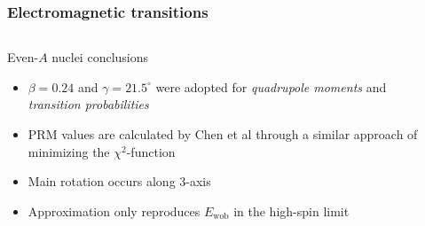 \documentclass{beamer}
\begin{document}
\begin{frame}
  \frametitle{Electromagnetic transitions}
  \begin{columns}
    \begin{column}{0.72\textwidth}
      \begin{block}{Even-$A$ nuclei conclusions}
        \begin{itemize}
          \item $\beta=0.24$ and $\gamma=21.5^\circ$ were adopted for \emph{quadrupole moments} and \emph{transition probabilities}
          \item \par PRM values are calculated by Chen et al through a similar approach of minimizing the $\chi^2$-function
          \item Main rotation occurs along $3$-axis
          \item Approximation only reproduces $E_\text{wob}$ in the high-spin limit
        \end{itemize}
      \end{block}
    \end{column}
    \begin{column}{0.28\textwidth}
      \begin{table}
        \centering
\end{table}
\end{column}
\end{columns}
\end{frame}
\end{document}
